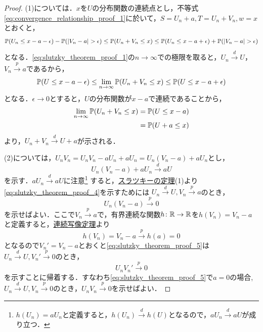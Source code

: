 \documentclass[main.tex]{subfiles}
\begin{document}
\begin{proof}
(1)については．$x$を$U$の分布関数の連続点とし，不等式\eqref{eq:convergence_relationship_proof_1}に於いて，$S = U_n + a, T = U_n + V_n, w = x$とおくと，
\begin{equation}
  \mathbb{P}(U_n  \leq x -a - \epsilon) - \mathbb{P}(|V_n - a| > \epsilon) \leq \mathbb{P}(U_n + V_n \leq x) \leq \mathbb{P}(U_n  \leq x -a + \epsilon) + \mathbb{P}(|V_n - a| > \epsilon)
  \label{eq:slutzky_theorem_proof_1}
\end{equation}
となる．\eqref{eq:slutzky_theorem_proof_1}の$n \to \infty$での極限を取ると，$U_n \xrightarrow{d} U$，$V_n \xrightarrow{p} a$であるから，
\begin{equation}
  \mathbb{P}(U \leq x -a - \epsilon) \leq \lim_{n \to \infty} \mathbb{P}(U_n + V_n \leq x) \leq \mathbb{P}(U \leq x -a + \epsilon)
  \label{eq:slutzky_theorem_proof_2}
\end{equation}
となる．$\epsilon \to 0$とすると，$U$の分布関数が$x - a$で連続であることから，
\begin{align}
  \lim_{n \to \infty} \mathbb{P}(U_n + V_n \leq x) &= \mathbb{P}(U \leq x -a) \notag \\
  &= \mathbb{P}(U + a \leq x)
  \label{eq:slutzky_theorem_proof_3}
\end{align}
より，$U_n + V_n \xrightarrow{d} U + a$が示される．

(2)については，$U_n V_n = U_n V_n - a U_n + a U_n = U_n (V_n - a) + a U_n $とし，
\begin{equation}
  U_n (V_n - a) + a U_n \xrightarrow{d} aU
  \label{eq:slutzky_theorem_proof_4}
\end{equation}
を示す．$aU_n \xrightarrow{d} aU$に注意\footnote{$h(U_n)=aU_n$と定義すると，$h(U_n) \xrightarrow{d} h(U)$となるので，$aU_n \xrightarrow{d} aU$が成り立つ．}
すると，\hyperref[prop:slutzky_theorem]{スラツキーの定理}(1)より\eqref{eq:slutzky_theorem_proof_4}を示すためには
$U_n \xrightarrow{d} U , V_n \xrightarrow{p} a$のとき，
\begin{equation}
  U_n (V_n - a) \xrightarrow{p} 0
  \label{eq:slutzky_theorem_proof_5}
\end{equation}
を示せばよい．ここで$V_n \xrightarrow{p} a$で，有界連続な関数$h \colon \mathbb{R} \to \mathbb{R}$を$h(V_n) = V_n -a $と定義すると，\hyperref[prop:continuous_mapping_theorem]{連続写像定理}より
\begin{equation}
  h(V_n) = V_n - a \xrightarrow{p} h(a) = 0
  \label{eq:slutzky_theorem_proof_6}
\end{equation}
となるので$V_n ' = V_n -a$とおくと\eqref{eq:slutzky_theorem_proof_5}は$U_n \xrightarrow{d} U , V_n ' \xrightarrow{p} 0$のとき，
\begin{equation}
  U_n V_n ' \xrightarrow{p} 0
  \label{eq:slutzky_theorem_proof_7}
\end{equation}
を示すことに帰着する．すなわち\eqref{eq:slutzky_theorem_proof_5}で$a=0$の場合, $U_n \xrightarrow{d} U , V_n \xrightarrow{p} 0$のとき，$U_n V_n \xrightarrow{p} 0$を示せばよい．


\end{proof}
\end{document}

